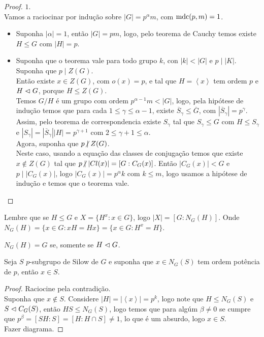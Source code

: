 \begin{proof}
  $1$.\\
  Vamos a raciocinar por indução sobre $|G|=p^{\alpha}m$, com $\operatorname{mdc}(p,m)=1$.\\
  \begin{itemize}
    \item Suponha $|\alpha|=1$, então $|G|=pm$, logo, pelo teorema de Cauchy temos existe $H\leq G$ com $|H|=p$.
    \item Suponha que o teorema vale para todo grupo $k$, con $|k|<  |G|$ e $p\mid |K|$.\\
      Suponha que $p\mid Z(G)$.\\
      Então existe $x\in Z(G)$, com $o(x)=p$, e tal que $H=\left\langle x \right\rangle$ tem ordem $p$ e $H\vartriangleleft G$, porque $H\leq Z(G)$.\\
      Temos $G/H$ é um grupo com ordem $p^{\alpha-1}m< |G|$, logo, pela hipótese de indução temos que para cada $1\leq\gamma\leq \alpha-1$, existe $\overline{S}_{\gamma}\leq \overline{G}$, com $|\overline{S}_{\gamma}|=p^{\gamma}$. Assim, pelo teorema de correspondencia existe $S_{\gamma}$ tal que $S_{\gamma}\leq G$ com $H\leq S_{\gamma}$ e $|S_{\gamma}|=|\overline{S}_{\gamma}||H|=p^{\gamma+1}$ com $2\leq \gamma+1\leq \alpha$.\\

      Agora, suponha que $p\centernot\mid Z(G)$.\\
      Neste caso, usando a equação das classes de conjugação temos que existe $x\notin Z(G)$ tal que $p\centernot\mid |Cl(x)|=[G:C_{G}(x)]$. Então $|C_{G}(x)|<G$ e $p\mid |C_{G}(x)|$, logo $|C_{G}(x)|=p^{\alpha}k$ com $k\leq m$, logo usamos a hipótese de indução e temos que o teorema vale. 
  \end{itemize}
\end{proof}
Lembre que se $H\leq G$ e $X=\{H^{x}:x\in G\}$, logo $|X|=[G:N_{G}(H)]$. Onde $N_{G}(H)=\{x\in G:xH=Hx\}=\{x\in G:H^{x}=H\}$.
\begin{note}
  $N_G(H)=G$ se, somente se $H\vartriangleleft G$. 
\end{note}
\begin{lemma}
  Seja $S$ $p$-subgrupo de Silow de $G$ e suponha que $x\in N_{G}(S)$ tem ordem potência de $p$, então $x\in S$. 
\end{lemma}
\begin{proof} 
  Raciocine pela contradição.\\
  Suponha que $x\notin S$. Considere $|H|=|\left\langle x \right\rangle|=p^{k}$, logo note que $H\leq N_{G}(S)$ e $S\vartriangleleft C_G(S)$, então $HS\leq N_{G}(S)$, logo temos que para algúm $\beta\neq 0$ se cumpre que $p^{\beta}=[SH:S]=[H:H\cap S]\neq 1$, lo que é um absurdo, logo $x\in S$.\\
  Fazer diagrama.
\end{proof}
